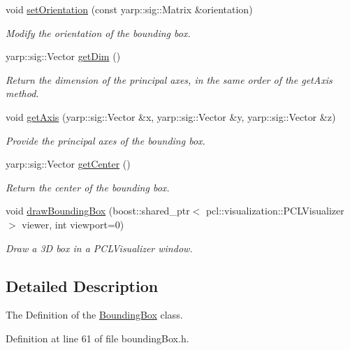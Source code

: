 \begin{DoxyCompactItemize}
void \hyperlink{classiCub_1_1data3D_1_1BoundingBox_a9d2cc0a0613750a48567f118d3b3a0eb}{set\+Orientation} (const yarp\+::sig\+::\+Matrix \&orientation)
\begin{DoxyCompactList}\small\item\em Modify the orientation of the bounding box. \end{DoxyCompactList}\item 
yarp\+::sig\+::\+Vector \hyperlink{classiCub_1_1data3D_1_1BoundingBox_a96d06a9d784ac627078353814207ad68}{get\+Dim} ()
\begin{DoxyCompactList}\small\item\em Return the dimension of the principal axes, in the same order of the get\+Axis method. \end{DoxyCompactList}\item 
void \hyperlink{classiCub_1_1data3D_1_1BoundingBox_a768e10207aef845d49e9788809b5f69f}{get\+Axis} (yarp\+::sig\+::\+Vector \&x, yarp\+::sig\+::\+Vector \&y, yarp\+::sig\+::\+Vector \&z)
\begin{DoxyCompactList}\small\item\em Provide the principal axes of the bounding box. \end{DoxyCompactList}\item 
yarp\+::sig\+::\+Vector \hyperlink{classiCub_1_1data3D_1_1BoundingBox_af16a8f9810623cfa43b0efcee20ebc44}{get\+Center} ()
\begin{DoxyCompactList}\small\item\em Return the center of the bounding box. \end{DoxyCompactList}\item 
void \hyperlink{classiCub_1_1data3D_1_1BoundingBox_a45bbf770b8c816f6c7d47ba747beaaaf}{draw\+Bounding\+Box} (boost\+::shared\+\_\+ptr$<$ pcl\+::visualization\+::\+P\+C\+L\+Visualizer $>$ viewer, int viewport=0)
\begin{DoxyCompactList}\small\item\em Draw a 3\+D box in a P\+C\+L\+Visualizer window. \end{DoxyCompactList}\end{DoxyCompactItemize}


\subsection{Detailed Description}
The Definition of the \hyperlink{classiCub_1_1data3D_1_1BoundingBox}{Bounding\+Box} class. 

Definition at line 61 of file bounding\+Box.\+h.



